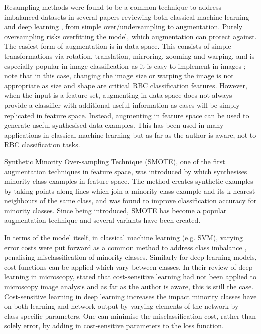 \documentclass[final,5p,times,twocolumn,authoryear]{elsarticle}
\begin{document}
Resampling methods were found to be a common technique to address imbalanced datasets in several papers reviewing both classical machine learning \citep{Lopez2013AnCharacteristics,Iranmehr2019Cost-sensitiveMachines} and deep learning \citep{Gupta2019DeepReview,Buda2018ANetworks,Min2017DeepBioinformatics}, from simple over/undersampling to augmentation. Purely oversampling risks overfitting the model, which augmentation can protect against. The easiest form of augmentation is in data space. This consists of simple transformations via rotation, translation, mirroring, zooming and warping, and is especially popular in image classification as it is easy to implement in images \citep{DeVriesDatasetSpace}; note that in this case, changing the image size or warping the image is not appropriate as size and shape are critical RBC classification features. However, when the input is a feature set, augmenting in data space does not always provide a classifier with additional useful information as cases will be simply replicated in feature space. Instead, augmenting in feature space can be used to generate useful synthesised data examples. This has been used in many applications in classical machine learning but as far as the author is aware, not to RBC classification tasks.

Synthetic Minority Over-sampling Technique (SMOTE), one of the first augmentation techniques in feature space, was introduced by \citet{Chawla2002SMOTE:Technique} which synthesises minority class examples in feature space. The method creates synthetic examples by taking points along lines which join a minority class example and its k nearest neighbours of the same class, and was found to improve classification accuracy for minority classes. Since being introduced, SMOTE has become a popular augmentation technique and several variants have been created. 

In terms of the model itself, in classical machine learning (e.g. SVM), varying error costs were put forward as a common method to address class imbalance \citep{Batuwita2013ClassMachines}, penalising misclassification of minority classes. Similarly for deep learning models, cost functions can be applied which vary between classes. In their review of deep learning in microscopy, \citet{Xing2018DeepSurvey} stated that cost-sensitive learning had not been applied to microscopy image analysis and as far as the author is aware, this is still the case. Cost-sensitive learning in deep learning increases the impact minority classes have on both learning and network output by varying elements of the network by class-specific parameters. One can minimise the misclassification cost, rather than solely error, by adding in cost-sensitive parameters to the loss function. 
\end{document}
